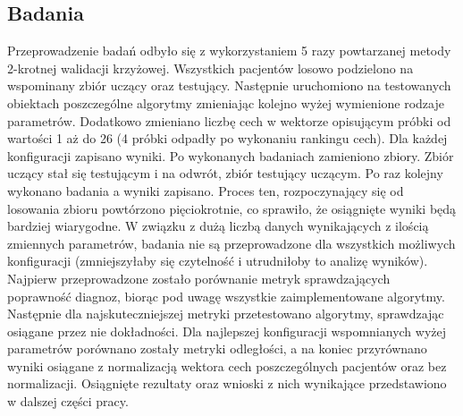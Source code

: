 \documentclass[12pt]{article}
\begin{document}
\subsection{Badania}
\indent  Przeprowadzenie badań odbyło się z wykorzystaniem 5 razy powtarzanej metody 2-krotnej walidacji krzyżowej. Wszystkich pacjentów losowo podzielono na wspominany zbiór uczący oraz testujący. Następnie uruchomiono na testowanych obiektach poszczególne algorytmy zmieniając kolejno wyżej wymienione rodzaje parametrów. Dodatkowo zmieniano liczbę cech w wektorze opisującym próbki od wartości 1 aż do 26 (4 próbki odpadły po wykonaniu rankingu cech). Dla każdej konfiguracji zapisano wyniki. Po wykonanych badaniach zamieniono zbiory. Zbiór uczący stał się testującym i na odwrót, zbiór testujący uczącym. Po raz kolejny wykonano badania a wyniki zapisano. Proces ten, rozpoczynający się od losowania zbioru powtórzono pięciokrotnie, co sprawiło, że osiągnięte wyniki będą bardziej wiarygodne.
\newline
\indent W związku z dużą liczbą danych wynikających z ilością zmiennych parametrów, badania nie są przeprowadzone dla wszystkich możliwych konfiguracji (zmniejszyłaby się czytelność i utrudniłoby to analizę wyników). Najpierw przeprowadzone zostało porównanie metryk sprawdzających poprawność diagnoz, biorąc pod uwagę wszystkie zaimplementowane algorytmy. Następnie dla najskuteczniejszej metryki przetestowano algorytmy, sprawdzając osiągane przez nie dokładności. Dla najlepszej konfiguracji wspomnianych wyżej parametrów porównano zostały metryki odległości, a na koniec przyrównano wyniki osiągane z normalizacją wektora cech poszczególnych pacjentów oraz bez normalizacji. Osiągnięte rezultaty oraz wnioski z nich wynikające przedstawiono w dalszej części pracy.

\end{document}
